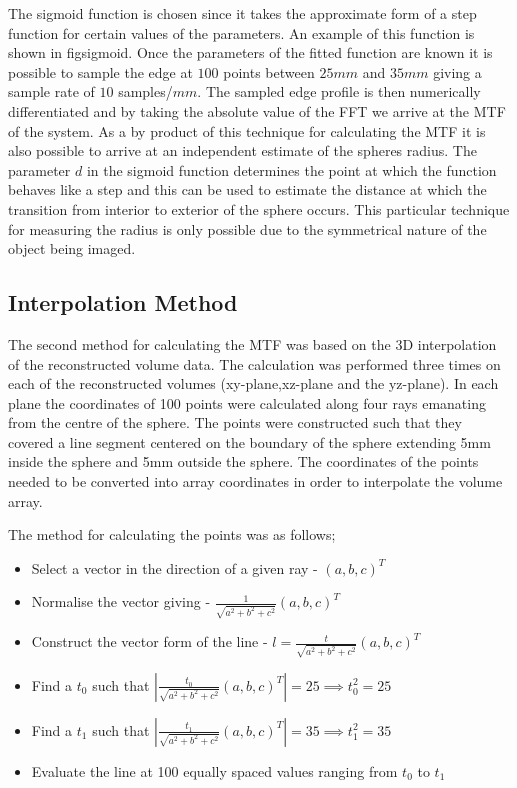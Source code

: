\documentclass[
  twoside,
  11pt, a4paper,
  footinclude=true,
  headinclude=true,
  cleardoublepage=empty
]{scrbook}
\begin{document}
The sigmoid function is chosen since it takes the approximate form of a step function for certain values of the parameters. An example of this function is shown in fig{sigmoid}. Once the parameters of the fitted function are known it is possible to sample the edge at $100$ points between $25mm$ and $35mm$ giving a sample rate of $10$ samples/$mm$. The sampled edge profile is then numerically differentiated and by taking the absolute value of the FFT we arrive at the MTF of the system. As a by product of this technique for calculating the MTF it is also possible to arrive at an independent estimate of the spheres radius. The parameter $d$ in the sigmoid function determines the point at which the function behaves like a step and this can be used to estimate the distance at which the transition from interior to exterior of the sphere occurs. This particular technique for measuring the radius is only possible due to the symmetrical nature of the object being imaged.

\subsection{Interpolation Method}

The second method for calculating the MTF was based on the 3D interpolation of the reconstructed volume data. The calculation was performed three times on each of the reconstructed volumes (xy-plane,xz-plane and the yz-plane). In each plane the coordinates of 100 points were calculated along four rays emanating from the centre of the sphere. The points were constructed such that they covered a line segment centered on the boundary of the sphere extending 5mm inside the sphere and 5mm outside the sphere. The coordinates of the points needed to be converted into array coordinates in order to interpolate the volume array.

The method for calculating the points was as follows;

\begin{itemize}
\item Select a vector in the direction of a given ray - $(a,b,c)^T$
\item Normalise the vector giving - $\frac{1}{\sqrt{a^2+b^2+c^2}}(a,b,c)^T$
\item Construct the vector form of the line - $l = \frac{t}{\sqrt{a^2+b^2+c^2}}(a,b,c)^T$
\item Find a $t_0$ such that $|\frac{t_0}{\sqrt{a^2+b^2+c^2}}(a,b,c)^T| = 25 \implies t_0^2 = 25$
\item Find a $t_1$ such that $|\frac{t_1}{\sqrt{a^2+b^2+c^2}}(a,b,c)^T| = 35 \implies t_1^2 = 35$
\item Evaluate the line at 100 equally spaced values ranging from $t_0$ to $t_1$
\end{itemize}
\end{document}

